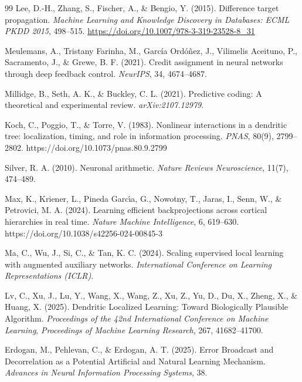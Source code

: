 \begin{thebibliography}{99}
    Lee, D.-H., Zhang, S., Fischer, A., \& Bengio, Y. (2015).
    Difference target propagation.
    \emph{Machine Learning and Knowledge Discovery in Databases: ECML PKDD 2015}, 498--515. \url{https://doi.org/10.1007/978-3-319-23528-8_31}
    
    Meulemans, A., Tristany Farinha, M., Garc{\'i}a Ord{\'o}{\~n}ez, J., Vilimelis Aceituno, P., Sacramento, J., \& Grewe, B. F. (2021).
    Credit assignment in neural networks through deep feedback control.
    \emph{NeurIPS}, 34, 4674--4687.
    
    Millidge, B., Seth, A. K., \& Buckley, C. L. (2021).
    Predictive coding: A theoretical and experimental review.
    \emph{arXiv:2107.12979}.
    
    Koch, C., Poggio, T., \& Torre, V. (1983).
    Nonlinear interactions in a dendritic tree: localization, timing, and role in information processing.
    \emph{PNAS}, 80(9), 2799--2802. https://doi.org/10.1073/pnas.80.9.2799
    
    Silver, R. A. (2010).
    Neuronal arithmetic.
    \emph{Nature Reviews Neuroscience}, 11(7), 474--489.
    
    Max, K., Kriener, L., Pineda Garc{\'\i}a, G., Nowotny, T., Jaras, I., Senn, W., \& Petrovici, M. A. (2024).
    Learning efficient backprojections across cortical hierarchies in real time.
    \emph{Nature Machine Intelligence}, 6, 619--630. https://doi.org/10.1038/s42256-024-00845-3
    
    Ma, C., Wu, J., Si, C., \& Tan, K. C. (2024).
    Scaling supervised local learning with augmented auxiliary networks.
    \emph{International Conference on Learning Representations (ICLR)}.
    
    Lv, C., Xu, J., Lu, Y., Wang, X., Wang, Z., Xu, Z., Yu, D., Du, X., Zheng, X., \& Huang, X. (2025).
    Dendritic Localized Learning: Toward Biologically Plausible Algorithm.
    \emph{Proceedings of the 42nd International Conference on Machine Learning}, \emph{Proceedings of Machine Learning Research}, 267, 41682--41700.
    
    Erdogan, M., Pehlevan, C., \& Erdogan, A. T. (2025).
    Error Broadcast and Decorrelation as a Potential Artificial and Natural Learning Mechanism.
    \emph{Advances in Neural Information Processing Systems}, 38.
    

\end{thebibliography}
